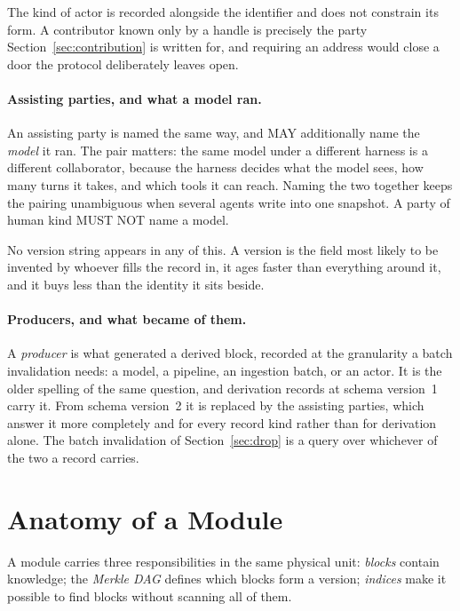 \documentclass[11pt,a4paper]{article}
\begin{document}
The kind of actor is recorded alongside the identifier and does not constrain
its form. A contributor known only by a handle is precisely the party
Section~\ref{sec:contribution} is written for, and requiring an address would
close a door the protocol deliberately leaves open.

\paragraph{Assisting parties, and what a model ran.}
An assisting party is named the same way, and MAY additionally name the
\emph{model} it ran. The pair matters: the same model under a different harness
is a different collaborator, because the harness decides what the model sees,
how many turns it takes, and which tools it can reach. Naming the two together
keeps the pairing unambiguous when several agents write into one snapshot. A
party of human kind MUST NOT name a model.

No version string appears in any of this. A version is the field most likely to
be invented by whoever fills the record in, it ages faster than everything
around it, and it buys less than the identity it sits beside.

\paragraph{Producers, and what became of them.}
A \emph{producer} is what generated a derived block, recorded at the granularity
a batch invalidation needs: a model, a pipeline, an ingestion batch, or an
actor. It is the older spelling of the same question, and derivation records at
schema version~1 carry it. From schema version~2 it is replaced by the
assisting parties, which answer it more completely and for every record kind
rather than for derivation alone. The batch invalidation of
Section~\ref{sec:drop} is a query over whichever of the two a record carries.

\section{Anatomy of a Module}
\label{sec:anatomy}

A module carries three responsibilities in the same physical unit:
\emph{blocks} contain knowledge; the \emph{Merkle DAG} defines which blocks
form a version; \emph{indices} make it possible to find blocks without
scanning all of them.
\end{document}
